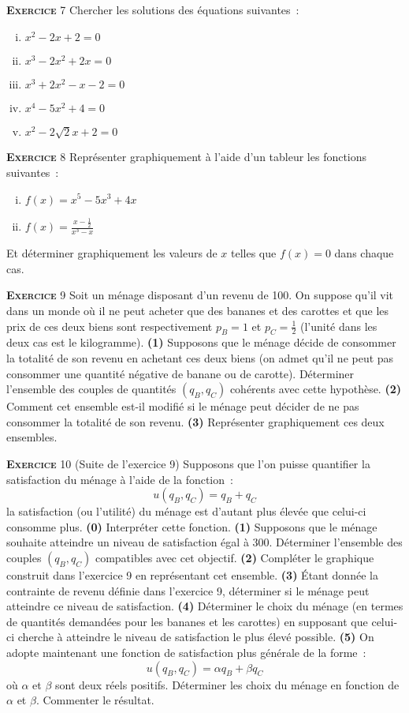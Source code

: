 \documentclass[10pt,a4paper,notitlepage]{article}
\newcommand{\exercice}[1]{\textsc{\textbf{Exercice}} #1}
\begin{document}
\bigskip

\exercice{7} Chercher les solutions des équations suivantes :
\begin{enumerate}[(i)]
\item $x^2-2x+2 = 0$
\item $x^3-2x^2+2x = 0$
\item $x^3+2x^2-x-2 = 0$
\item $x^4-5x^2+4 = 0$
\item $x^2 - 2\sqrt{2}x + 2 = 0$
\end{enumerate}

\bigskip

\exercice{8} Représenter graphiquement à l'aide d'un tableur les
fonctions suivantes :
\begin{enumerate}[(i)]
\item $f(x) = x^5- 5x^3 + 4x$
\item $f(x) = \frac{x-\frac{1}{2}}{x^3-x}$
\end{enumerate}
Et déterminer graphiquement les valeurs de $x$ telles que $f(x)=0$
dans chaque cas.

\bigskip

\exercice{9} Soit un ménage disposant d'un revenu de 100. On suppose
qu'il vit dans un monde où il ne peut acheter que des bananes et des
carottes et que les prix de ces deux biens sont respectivement $p_B=
1$ et $p_C = \frac{1}{2}$ (l'unité dans les deux cas est le
kilogramme). \textbf{(1)} Supposons que le ménage décide de consommer
la totalité de son revenu en achetant ces deux biens (on admet qu'il
ne peut pas consommer une quantité négative de banane ou de
carotte). Déterminer l'ensemble des couples de quantités $(q_B, q_C)$
cohérents avec cette hypothèse. \textbf{(2)} Comment cet ensemble est-il
modifié si le ménage peut décider de ne pas consommer la totalité de
son revenu. \textbf{(3)} Représenter graphiquement ces deux ensembles.

\bigskip

\exercice{10} (Suite de l'exercice 9) Supposons que l'on puisse
quantifier la satisfaction du ménage à l'aide de la fonction :
\[
u(q_B, q_C) = q_B + q_C
\]
la satisfaction (ou l'utilité) du ménage est d'autant plus élevée que
celui-ci consomme plus. \textbf{(0)} Interpréter cette
fonction. \textbf{(1)} Supposons que le ménage souhaite atteindre un
niveau de satisfaction égal à 300. Déterminer l'ensemble des couples
$(q_B, q_C)$ compatibles avec cet objectif. \textbf{(2)} Compléter le
graphique construit dans l'exercice 9 en représentant cet ensemble.
\textbf{(3)} Étant donnée la contrainte de revenu définie dans
l'exercice 9, déterminer si le ménage peut atteindre ce niveau de
satisfaction. \textbf{(4)} Déterminer le choix du ménage (en termes de
quantités demandées pour les bananes et les carottes) en supposant que
celui-ci cherche à atteindre le niveau de satisfaction le plus élevé
possible. \textbf{(5)} On adopte maintenant une fonction de
satisfaction plus générale de la forme :
\[
u(q_B, q_C) = \alpha q_B + \beta q_C
\]
où $\alpha$ et $\beta$ sont deux réels positifs. Déterminer les choix
du ménage en fonction de $\alpha$ et $\beta$. Commenter le résultat.
\end{document}
